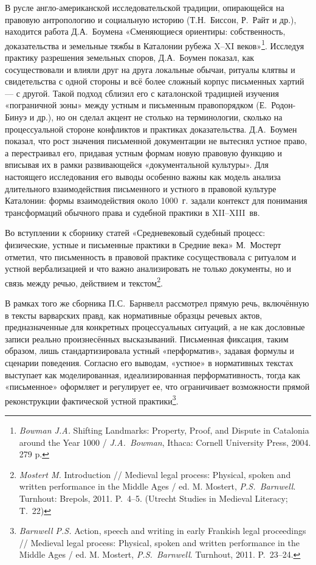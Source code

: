В русле англо-американской исследовательской традиции, опирающейся на правовую антропологию и социальную историю (Т.Н.~Биссон, Р.~Райт и др.), находится работа Д.А.~Боумена «Сменяющиеся ориентиры: собственность, доказательства и земельные тяжбы в Каталонии рубежа X--XI веков»\footnote{\emph{Bowman J.A.} Shifting Landmarks: Property, Proof, and Dispute in Catalonia around the Year 1000 / \emph{J.A.~Bowman}, Ithaca: Cornell University Press, 2004. 279 p.}. Исследуя практику разрешения земельных споров, Д.А.~Боумен показал, как сосуществовали и влияли друг на друга локальные обычаи, ритуалы клятвы и свидетельства с одной стороны и всё более сложный корпус письменных хартий --- с другой. Такой подход сблизил его с каталонской традицией изучения «пограничной зоны» между устным и письменным правопорядком (Е.~Родон-Бинуэ и др.), но он сделал акцент не столько на терминологии, сколько на процессуальной стороне конфликтов и практиках доказательства. Д.А.~Боумен показал, что рост значения письменной документации не вытеснял устное право, а перестраивал его, придавая устным формам новую правовую функцию и вписывая их в рамки развивающейся «документальной культуры». Для настоящего исследования его выводы особенно важны как модель анализа длительного взаимодействия письменного и устного в правовой культуре Каталонии: формы взаимодействия около 1000~г. задали контекст для понимания трансформаций обычного права и судебной практики в XII--XIII~вв.

Во вступлении к сборнику статей «Средневековый судебный процесс: физические, устные и письменные практики в Средние века» М.~Мостерт отметил, что письменность в правовой практике сосуществовала с ритуалом и устной вербализацией и что важно анализировать не только документы, но и связь между речью, действием и текстом\footnote{\emph{Mostert M.} Introduction // Medieval legal process: Physical, spoken and written performance in the Middle Ages / ed. M. Mostert, \emph{P.S.~Barnwell}. Turnhout: Brepols, 2011. P.~4--5. (Utrecht Studies in Medieval Literacy; T.~22)}.

В рамках того же сборника П.С.~Барнвелл рассмотрел прямую речь, включённую в тексты варварских правд, как нормативные образцы речевых актов, предназначенные для конкретных процессуальных ситуаций, а не как дословные записи реально произнесённых высказываний. Письменная фиксация, таким образом, лишь стандартизировала устный «перформатив», задавая формулы и сценарии поведения. Согласно его выводам, «устное» в нормативных текстах выступает как моделированная, идеализированная перформативность, тогда как «письменное» оформляет и регулирует ее, что ограничивает возможности прямой реконструкции фактической устной практики\footnote{\emph{Barnwell P.S. }Action, speech and writing in early Frankish legal proceedings // Medieval legal process: Physical, spoken and written performance in the Middle Ages / ed. M. Mostert, \emph{P.S.~Barnwell}. Turnhout, 2011. P.~23--24.}.

